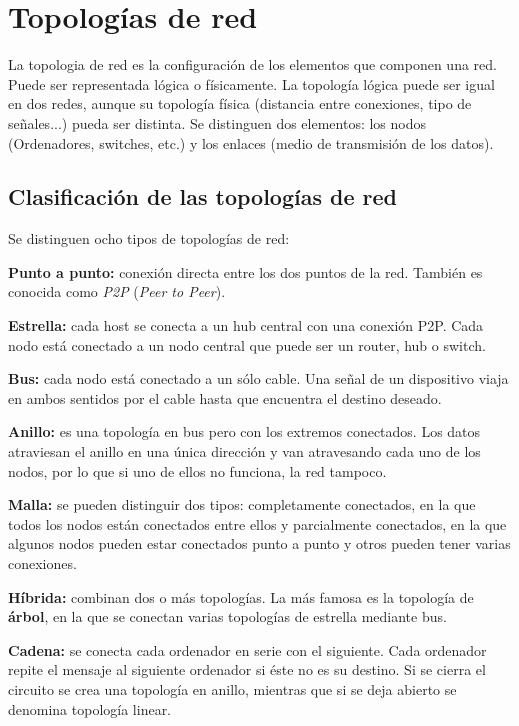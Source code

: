 \documentclass[a4paper, 11pt]{report} %
\begin{document}
\section{Topologías de red}
\label{topdred}
La \gls{topologia} de red es la configuración de los elementos que componen una red. Puede ser representada lógica o físicamente. La topología lógica puede ser igual en dos redes, aunque su topología física (distancia entre conexiones, tipo de señales...) pueda ser distinta. Se distinguen dos elementos: los nodos (Ordenadores, switches, etc.) y los enlaces (medio de transmisión de los datos).
\subsection{Clasificación de las topologías de red}
Se distinguen ocho tipos de topologías de red: \cite{bicsi-02}
\renewcommand{\labelitemi}{$\bullet$}
\begin{description}
\item \textbf{Punto a punto:} conexión directa entre los dos puntos de la red. También es conocida como \textit{P2P} (\textit{Peer to Peer}).
\item \textbf{Estrella:} cada host se conecta a un hub central con una conexión P2P. Cada nodo está conectado a un nodo central que puede ser un router, hub o switch.
\item \textbf{Bus:} cada nodo está conectado a un sólo cable. Una señal de un dispositivo viaja en ambos sentidos por el cable hasta que encuentra el destino deseado.
\item \textbf{Anillo:} es una topología en bus pero con los extremos conectados. Los datos atraviesan el anillo en una única dirección y van atravesando cada uno de los nodos, por lo que si uno de ellos no funciona, la red tampoco.
\item \textbf{Malla:} se pueden distinguir dos tipos: completamente conectados, en la que todos los nodos están conectados entre ellos y parcialmente conectados, en la que algunos nodos pueden estar conectados punto a punto y otros pueden tener varias conexiones.
\item \textbf{Híbrida:} combinan dos o más topologías. La más famosa es la topología de \textbf{árbol}, en la que se conectan varias topologías de estrella mediante bus. 
\item \textbf{Cadena:} se conecta cada ordenador en serie con el siguiente. Cada ordenador repite el mensaje al siguiente ordenador si éste no es su destino. Si se cierra el circuito se crea una topología en anillo, mientras que si se deja abierto se denomina topología linear.
\end{description}
\end{document}
